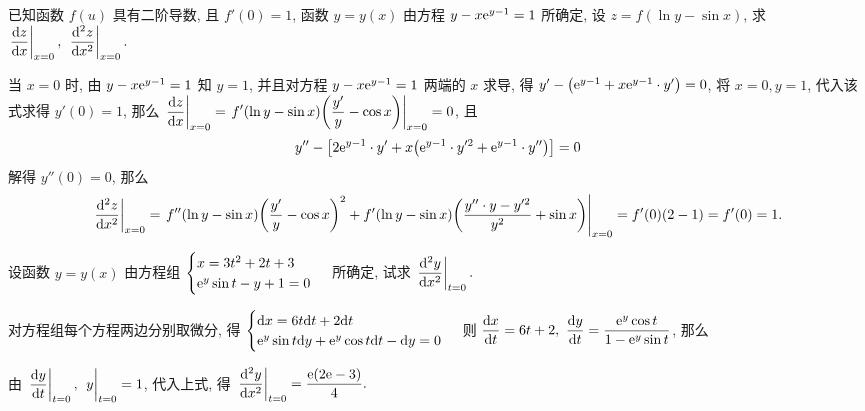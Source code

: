 \begin{example}[2007 数二]
    已知函数 $f(u)$ 具有二阶导数, 且 $f'(0)=1$, 函数 $y=y(x)$ 由方程 $y-x\mathrm{e} ^{y-1}=1$ 所确定, 设 $z=f(\ln y-\sin x)$, 求 $\displaystyle \eval{\dv{z}{x}}_{x=0},~\eval{\dv[2]{z}{x}}_{x=0}.$
\end{example}
\begin{solution}
    当 $x=0$ 时, 由 $y-x\mathrm{e} ^{y-1}=1$ 知 $y=1$, 并且对方程 $y-x\mathrm{e} ^{y-1}=1$ 两端的 $x$ 求导, 得 $y'-\qty(\mathrm{e} ^{y-1}+x\mathrm{e} ^{y-1}\cdot y')=0$, 将 $x=0,y=1$, 代入该式求得 $y'(0)=1$, 那么
    $\displaystyle \eval{\dv{z}{x}}_{x=0}=\eval{f'(\ln y-\sin x)\qty(\dfrac{y'}{y}-\cos x)}_{x=0}=0$, 且 $$y''-\qty[2\mathrm{e} ^{y-1}\cdot y'+x\qty(\mathrm{e} ^{y-1}\cdot y'^2+\mathrm{e} ^{y-1}\cdot y'')]=0$$
    解得 $y''(0)=0$, 那么
    $$\eval{\dv[2]{z}{x}}_{x=0}=\eval{f''(\ln y-\sin x)\qty(\dfrac{y'}{y}-\cos x)^2+f'(\ln y-\sin x)\qty(\dfrac{y''\cdot y-y'^2}{y^2}+\sin x)}_{x=0}=f'(0)(2-1)=f'(0)=1.$$
\end{solution}

\begin{example}
    设函数 $y=y(x)$ 由方程组 $\begin{cases}
            x=3t^2+2t+3 \\ \mathrm{e}^y\sin t-y+1=0
        \end{cases}$ 所确定, 试求 $\displaystyle\eval{\dv[2]{y}{x}}_{t=0}.$
\end{example}
\begin{solution}
    对方程组每个方程两边分别取微分, 得 $\begin{cases}
            \dd x=6t\dd t+2\dd t \\ \mathrm{e}^y\sin t\dd y+\mathrm{e}^y\cos t\dd t-\dd y=0
        \end{cases}$ 则 $\displaystyle\dv{x}{t}=6t+2,~\dv{y}{t}=\dfrac{\mathrm{e}^y\cos t}{1-\mathrm{e}^y\sin t}$, 那么
    由 $\displaystyle\eval{\dv{y}{t}}_{t=0},~\eval{y}_{t=0}=1$, 代入上式, 得 $\displaystyle\eval{\dv[2]{y}{x}}_{t=0}=\dfrac{\e(2\e-3)}{4}.$
\end{solution}

